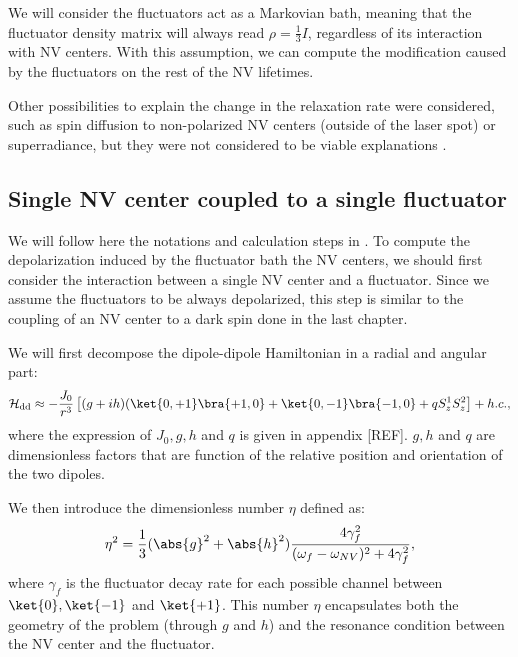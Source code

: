 \documentclass[a4paper,11pt]{report}
\begin{document}
We will consider the fluctuators act as a Markovian bath, meaning that the fluctuator density matrix will always read $\rho = \frac{1}{3} I$, regardless of its interaction with NV centers. With this assumption, we can compute the modification caused by the fluctuators on the rest of the NV lifetimes.

Other possibilities to explain the change in the relaxation rate were considered, such as spin diffusion to non-polarized NV centers (outside of the laser spot) or superradiance, but they were not considered to be viable explanations \citep{choi2017depolarization}.

\subsection{Single NV center coupled to a single fluctuator}
We will follow here the notations and calculation steps in \citep{choi2017depolarization}. To compute the depolarization induced by the fluctuator bath the NV centers, we should first consider the interaction between a single NV center and a fluctuator. Since we assume the fluctuators to be always depolarized, this step is similar to the coupling of an NV center to a dark spin done in the last chapter.

We will first decompose the dipole-dipole Hamiltonian in a radial and angular part:
\begin{equation}
\mathcal{H}_{\rm dd} \approx - \frac{J_0}{r^3} \left[(g+ih)(\ket{0,+1}\bra{+1,0}+\ket{0,-1}\bra{-1,0}+qS_z^1 S_z^2 \right] + h.c. ,
\end{equation}
where the expression of $J_0, g, h$ and $q$ is given in appendix [REF]. $g, h$ and $q$ are dimensionless factors that are function of the relative position and orientation of the two dipoles.

We then introduce the dimensionless number $\eta$ defined as:
\begin{equation}
\label{eq eta}
\eta^2=\frac{1}{3} (\abs{g}^2+\abs{h}^2)  \frac{4\gamma_f^2}{(\omega_f - \omega_{NV})^2+4\gamma_f^2},
\end{equation}
where $\gamma_f$ is the fluctuator decay rate for each possible channel between $\ket{0}, \ket{-1}$ and $\ket{+1}$. This number $\eta$ encapsulates both the geometry of the problem (through $g$ and $h$) and the resonance condition between the NV center and the fluctuator.
\end{document}

